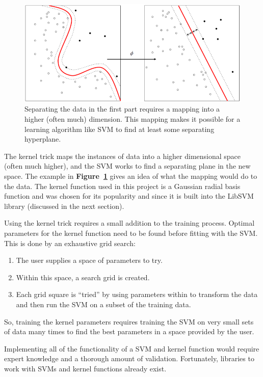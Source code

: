 \documentclass[11pt]{article} %
\begin{document}
\begin{figure}[h]
  \centering
  \includegraphics[scale=.6]{images/kernel-machine.png}
  \caption{Separating the data in the first part requires a mapping into a higher
      (often much) dimension. This mapping makes it possible for a learning 
  algorithm like SVM to find at least some separating hyperplane.}
  \label{fig:kernel-machine}
\end{figure}

The kernel trick maps the instances of data into a higher dimensional space 
(often much higher), and the SVM works to find a separating plane in the new 
space. The example in \textbf{Figure~\ref{fig:kernel-machine}} gives an idea
of what the mapping would do to the data. The kernel function used in this 
project is a Gaussian radial basis function and was chosen for its popularity
and since it is built into the LibSVM library \cite{chang2011libsvm} (discussed in
the next section). 

Using the kernel trick requires a small addition to the training process. Optimal
parameters for the kernel function need to be found before fitting with the SVM.
This is done by an exhaustive grid search:
\begin{enumerate}
    \item The user supplies a space of parameters to try.
    \item Within this space, a search grid is created.
    \item Each grid square is ``tried'' by using parameters within to transform
        the data and then run the SVM on a subset of the training data.
\end{enumerate}

So, training the kernel parameters requires training the SVM on very small sets
of data many times to find the best parameters in a space provided by the user.

Implementing all of the functionality of a SVM and kernel function would require
expert knowledge and a thorough amount of validation. Fortunately, libraries to 
work with SVMs and kernel functions already exist.
\end{document}
